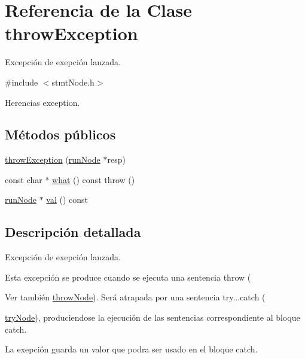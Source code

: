 \hypertarget{classthrowException}{\section{Referencia de la Clase throw\-Exception}
\label{classthrowException}
}


Excepción de exepción lanzada.  




{\ttfamily \#include $<$stmt\-Node.\-h$>$}



Herencias exception.

\subsection*{Métodos públicos}
\begin{DoxyCompactItemize}
\item 
\hyperlink{classthrowException_a9b3d37eabcdd2841672fdabc6a0ffe65}{throw\-Exception} (\hyperlink{classrunNode}{run\-Node} $\ast$resp)
\item 
const char $\ast$ \hyperlink{classthrowException_a2fcd0c26e36f52202b8ae47a7e5492b5}{what} () const   throw ()
\item 
\hyperlink{classrunNode}{run\-Node} $\ast$ \hyperlink{classthrowException_a5892f51167089867cf41046f1c034cc7}{val} () const 
\end{DoxyCompactItemize}


\subsection{Descripción detallada}
Excepción de exepción lanzada. 

Esta excepción se produce cuando se ejecuta una sentencia throw (\begin{DoxySeeAlso}{Ver también}
\hyperlink{classthrowNode}{throw\-Node}). Será atrapada por una sentencia try...catch (

\hyperlink{classtryNode}{try\-Node}), produciendose la ejecución de las sentencias correspondiente al bloque catch.
\end{DoxySeeAlso}
La exepción guarda un valor que podra ser usado en el bloque catch. 


